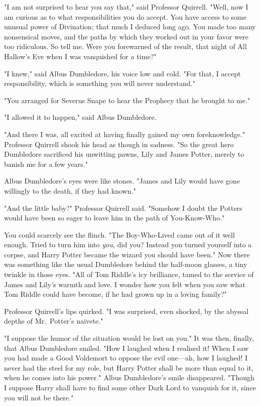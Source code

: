 "I am not surprised to hear you say that," said Professor Quirrell. "Well, now
I am curious as to what responsibilities you do accept. You have access to some
unusual power of Divination; that much I deduced long ago. You made too many
nonsensical moves, and the paths by which they worked out in your favor were
too ridiculous. So tell me. Were you forewarned of the result, that night of
All Hallow's Eve when I was vanquished for a time?"

"I knew," said Albus Dumbledore, his voice low and cold. "For that, I accept
responsibility, which is something you will never understand."

"You arranged for Severus Snape to hear the Prophecy that he brought to me."

"I allowed it to happen," said Albus Dumbledore.

"And there I was, all excited at having finally gained my own foreknowledge."
Professor Quirrell shook his head as though in sadness. "So the great hero
Dumbledore sacrificed his unwitting pawns, Lily and James Potter, merely to
banish me for a few years."

Albus Dumbledore's eyes were like stones. "James and Lily would have gone
willingly to the death, if they had known."

"And the little baby?" Professor Quirrell said. "Somehow I doubt the Potters
would have been so eager to leave him in the path of You-Know-Who."

You could scarcely see the flinch. "The Boy-Who-Lived came out of it well
enough. Tried to turn him into \emph{you}, did you? Instead you turned yourself
into a corpse, and Harry Potter became the wizard you should have been." Now
there was something like the usual Dumbledore behind the half-moon glasses, a
tiny twinkle in those eyes. "All of Tom Riddle's icy brilliance, tamed to the
service of James and Lily's warmth and love. I wonder how you felt when you saw
what Tom Riddle could have become, if he had grown up in a loving family?"

Professor Quirrell's lips quirked. "I was surprised, even shocked, by the
abyssal depths of Mr.~Potter's naivete."

"I suppose the humor of the situation would be lost on you." It was then,
finally, that Albus Dumbledore smiled. "How I laughed when I realised it! When
I saw you had made a Good Voldemort to oppose the evil one---ah, how I laughed!
I never had the steel for my role, but Harry Potter shall be more than equal to
it, when he comes into his power." Albus Dumbledore's smile disappeared.
"Though I suppose Harry shall have to find some other Dark Lord to vanquish for
it, since you will not be there."


